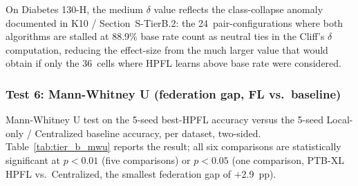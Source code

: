 \documentclass[conference]{IEEEtran}
\begin{document}
\begin{table}[htbp]
\centering
\caption{Cliff's $\delta$ effect-size for HPFL vs.\ FedAvg, per dataset, on the 60~paired configurations. All three datasets show $\delta\geq +0.43$ (medium-to-maximal effect); the Cardiovascular result $\delta{=}+0.96$ is near-maximum (essentially total HPFL dominance).}
\label{tab:tier_b_cliff}
\small
{}

\vspace{1mm}
\footnotesize{On Diabetes 130-H, the medium $\delta$ value reflects the class-collapse anomaly documented in K10 / Section~S-TierB.2: the 24~pair-configurations where both algorithms are stalled at 88.9\% base rate count as neutral ties in the Cliff's $\delta$ computation, reducing the effect-size from the much larger value that would obtain if only the 36~cells where HPFL learns above base rate were considered.}
\end{table}

\subsubsection*{Test 6: Mann-Whitney U (federation gap, FL vs.\ baseline)}

Mann-Whitney U test on the 5-seed best-HPFL accuracy versus the 5-seed Local-only / Centralized baseline accuracy, per dataset, two-sided. Table~\ref{tab:tier_b_mwu} reports the result; all six comparisons are statistically significant at $p<0.01$ (five comparisons) or $p<0.05$ (one comparison, PTB-XL HPFL vs.\ Centralized, the smallest federation gap of $+$2.9~pp).
\end{document}
